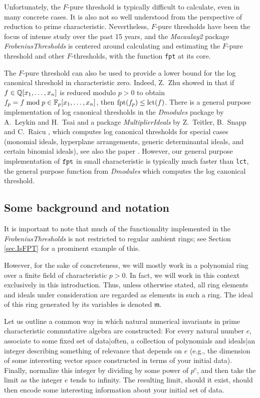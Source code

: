 \documentclass{amsart}
\newcommand{\idealm}{\mathfrak{m}}
\begin{document}
Unfortunately, the $F$-pure threshold is typically difficult to calculate, even in many concrete cases.   It is also not so well understood from the perspective of reduction to prime characteristic.   Nevertheless, $F$-pure thresholds have been the focus of intense study over the past 15 years, and the \emph{Macaulay2} package \emph{FrobeniusThresholds} is centered around calculating and estimating the $F$-pure threshold and other $F$-thresholds, with the function {\tt fpt} at its core.

The $F$-pure threshold can also be used to provide a lower bound for the log canonical threshold in characteristic zero.  Indeed, Z.~Zhu showed in \cite[Corollary 4.2]{ZhuLogCanoincalThresholdsInPositiveChar} that if $f \in \mathbb{Q}[x_1, \dots, x_n]$ is reduced modulo $p > 0$ to obtain $f_p = f\;\mathrm{mod}\;p \in \mathbb{F}_p[x_1, \dots, x_n]$, then $\operatorname{{fpt}}(f_p) \leq \operatorname{{lct}}(f)$.  There is a general purpose implementation of log canonical thresholds in the \emph{Dmodules} package by A.~Leykin and H.~Tsai \cite{DmodulesSource} and a package \emph{MultiplierIdeals} by Z.~Teitler, B.~Snapp and C.~Raicu \cite{MultiplierIdealsPackage}, which computes log canonical thresholds for special cases (monomial ideals, hyperplane arrangements, generic determinantal ideals, and certain binomial ideals), see also the paper \cite{MultiplierIdealsArticle}.  However, our general purpose implementation of ${\tt fpt}$ in small characteristic is typically much faster than {\tt lct}, the general purpose function from \emph{Dmodules} which computes the log canonical threshold.

\subsection*{Some background and notation}
It is important to note that much of the functionality implemented in the \emph{FrobeniusThresholds} is not restricted to regular ambient rings; see Section \ref{sec.IsFPT} for a prominent example of this.

However, for the sake of concreteness, we will mostly work in a polynomial ring over a finite field of  characteristic $p>0$.  In fact,  we will work in this context exclusively in this introduction.  Thus, unless otherwise stated, all ring elements and ideals under consideration are regarded as elements in such a ring.  The ideal of this ring generated by its variables is denoted $\idealm$.

Let us outline a common way in which natural numerical invariants in prime characteristic commutative algebra are constructed:  For every natural number $e$, associate to some fixed set of data|often, a collection of polynomials and ideals|an integer describing something of relevance that depends on $e$ (e.g., the dimension of some interesting vector space constructed in terms of your initial data).   Finally, normalize this integer by dividing by some power of $p^e$, and then take the limit as the integer $e$ tends to infinity.  The resulting limit, should it exist, should then encode some interesting information about your initial set of data.
\end{document}
